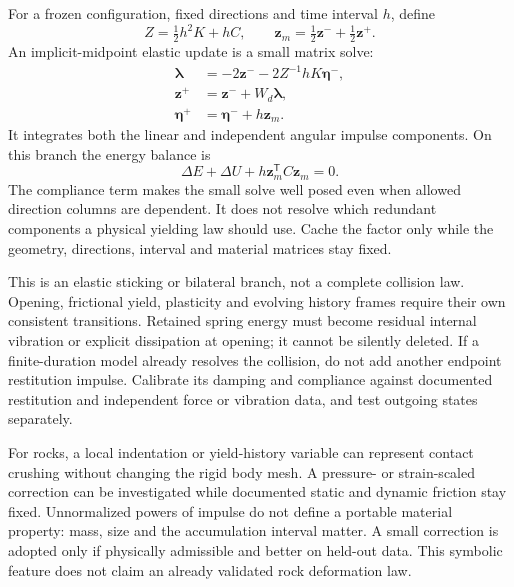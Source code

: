 \documentclass[11pt,a4paper]{article}
\begin{document}
For a frozen configuration, fixed directions and time interval $h$, define
\begin{equation}
 Z=\tfrac12h^2K+hC,\qquad
 \mathbf z_m=\tfrac12\mathbf z^-+\tfrac12\mathbf z^+.
\end{equation}
An implicit-midpoint elastic update is a small matrix solve:
\begin{align}
 [W_d+2Z^{-1}]\boldsymbol\lambda&=-2\mathbf z^- -2Z^{-1}hK\boldsymbol\eta^-,\\
 \mathbf z^+&=\mathbf z^-+W_d\boldsymbol\lambda,\\
 \boldsymbol\eta^+&=\boldsymbol\eta^-+h\mathbf z_m.
\end{align}
It integrates both the linear and independent angular impulse components. On this branch the energy balance is
\begin{equation}
 \boxed{\Delta E+\Delta U+h\mathbf z_m^{\mathsf T}C\mathbf z_m=0}.
\end{equation}
The compliance term makes the small solve well posed even when allowed direction columns are dependent. It does not resolve which redundant components a physical yielding law should use. Cache the factor only while the geometry, directions, interval and material matrices stay fixed.

This is an elastic sticking or bilateral branch, not a complete collision law. Opening, frictional yield, plasticity and evolving history frames require their own consistent transitions. Retained spring energy must become residual internal vibration or explicit dissipation at opening; it cannot be silently deleted. If a finite-duration model already resolves the collision, do not add another endpoint restitution impulse. Calibrate its damping and compliance against documented restitution and independent force or vibration data, and test outgoing states separately.

For rocks, a local indentation or yield-history variable can represent contact crushing without changing the rigid body mesh. A pressure- or strain-scaled correction can be investigated while documented static and dynamic friction stay fixed. Unnormalized powers of impulse do not define a portable material property: mass, size and the accumulation interval matter. A small correction is adopted only if physically admissible and better on held-out data. This symbolic feature does not claim an already validated rock deformation law.
\end{document}
